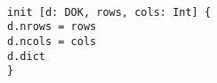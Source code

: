 \begin{myquote}\small{\texttt{\\
\Bpred init [d: DOK, rows, cols: Int] \{\\
\TA d.nrows = rows\\
\TA d.ncols = cols\\
\TA \Bno d.dict\\
\}
}}
\end{myquote}